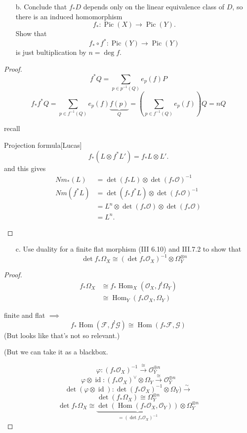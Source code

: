 \begin{enumerate}
	\item[b.] Conclude that $f_* D$ depends only on the linear equivalence class of $D$, so there is an induced homomorphism
		\[f_* :\operatorname{Pic}(X) \longrightarrow \operatorname{Pic}(Y).\]
		Show that
		\[f_* \circ f^* :\operatorname{Pic}(Y) \longrightarrow \operatorname{Pic}(Y)\]
		is just bultiplication by $n=\operatorname{deg}f$.
\end{enumerate}
\begin{proof}\leavevmode
	\[f^* Q=\sum_{p\in p^{-1}(Q)}e_p(f)P\]
	\[f_* f^* Q=\sum_{p\in f^{-1}(Q)}e_p(f)\underbrace{f(p)}_{Q}=\left( \sum_{p\in f^{-1}(Q)}e_p(f) \right) Q=nQ\]

	recall
	\begin{thing4}{Projection formula}[Lucas]\leavevmode
		 \[f_*(L\otimes f^*L')=f_* L\otimes L'.\]
		 and this gives
		 \begin{align*}
		 	Nm_*(L)&=\det (f_* L)\otimes\det (f_* \mathcal{O})^{-1}\\
			Nm( f^*L)&=\det (f_* f^*L)\otimes \det (f_* \mathcal{O})^{-1}\\
			&=L^n\otimes\det (f_* \mathcal{O})\otimes \det(f_* \mathcal{O})\\
			&=L^n.
		 \end{align*}
	\end{thing4}
\end{proof}

\begin{enumerate}
	\item[c.] Use duality for a finite flat morphism (III 6.10) and III.7.2 to show that
		 \[\det f_* \Omega_X\cong (\det f_* \mathcal{O}_X)^{-1}\otimes\Omega_Y^{\otimes n}\]
\end{enumerate}

\begin{proof}\leavevmode
	\begin{align*}
		f_* \Omega_X&\cong f_* \operatorname{Hom}_X(\mathcal{O}_X,f^!\Omega_Y)\\
			    &\cong \operatorname{Hom}_Y(f_* \mathcal{O}_X,\Omega_Y)
	\end{align*}
	\begin{remark}[Lucas]\leavevmode
		finite and flat $\implies $\[f_* \operatorname{Hom}(\mathcal{F},f^!\mathcal{G})\cong \operatorname{Hom}(f_* \mathcal{F},\mathcal{G})\]
		(But looks like that's not so relevant.)
	\end{remark}
	(But we can take it as a blackbox.

	\[\varphi:(f_* \mathcal{O}_X)^{-1}\overset{\cong }{\longrightarrow}\mathcal{O}_Y^{\oplus n}\]
	\[\varphi\otimes\operatorname{id}:(f_* \mathcal{O}_X)^{\vee}\otimes\Omega_Y\overset{\cong }{\longrightarrow}\mathcal{O}^{\oplus n}_Y\]
	\[\det(\varphi\otimes\operatorname{id}):\det(f_* \mathcal{O}_X)^{-1}\otimes\Omega_Y)\overset{\sim}{\longrightarrow}\]
	\[\det(f_* \Omega_X)\cong \Omega_Y^{\otimes n}\]
	\[\det f_* \Omega_X\cong \underbrace{\det(\operatorname{Hom}(f_* \mathcal{O}_X,\mathcal{O}_Y))}_{=(\det f_* \mathcal{O}_X)^{-1}}\otimes\Omega_Y^{\otimes n}\]
\end{proof}

